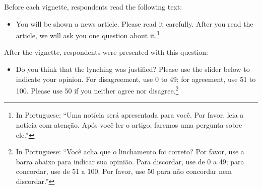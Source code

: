 \documentclass[12pt,ansiapaper]{article}
\providecommand{\tightlist}{%
   \setlength{\itemsep}{0pt}\setlength{\parskip}{0pt}}
\begin{document}
Before each vignette, respondents read the following text:

\begin{itemize}
\tightlist
\item
  You will be shown a news article. Please read it carefully. After you read the article, we will ask you one question about it.\footnote{In Portuguese: ``Uma notícia será apresentada para você. Por favor, leia a notícia com atenção. Após você ler o artigo, faremos uma pergunta sobre ele.''}
\end{itemize}

After the vignette, respondents were presented with this question:

\begin{itemize}
\tightlist
\item
  Do you think that the lynching was justified? Please use the slider below to indicate your opinion. For disagreement, use 0 to 49; for agreement, use 51 to 100. Please use 50 if you neither agree nor disagree.\footnote{In Portuguese: ``Você acha que o linchamento foi correto? Por favor, use a barra abaixo para indicar sua opinião. Para discordar, use de 0 a 49; para concordar, use de 51 a 100. Por favor, use 50 para não concordar nem discordar.''}
\end{itemize}
\end{document}
